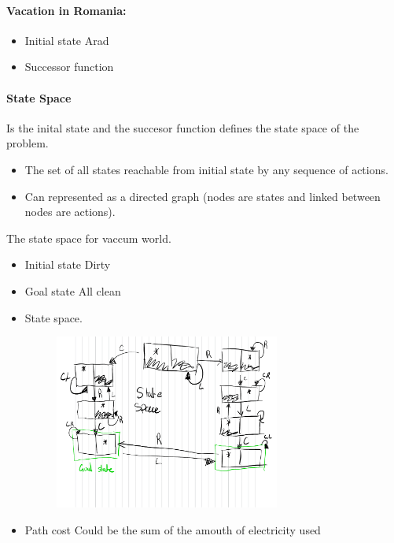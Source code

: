 \documentclass{article}
\begin{document}
\paragraph{Vacation in Romania:}

\begin{itemize}
  \item Initial state
    \subitem Arad
  \item Successor function
    \subitem 
\end{itemize}

\paragraph{State Space}
Is the inital state and the succesor function defines the state space of the
problem. 
\begin{itemize}
  \item The set of all states reachable from initial state by any sequence of
    actions.
  \item Can represented as a directed graph (nodes are states and linked between
    nodes are actions).
\end{itemize}

The state space for vaccum world.
\begin{itemize}
  \item Initial state 
    \subitem Dirty
  \item Goal state
    \subitem All clean
  \item State space.
    \subitem 
    \begin{figure}[H]
      \center
      \includegraphics[width=0.7\textwidth]{./statespace.pdf}
    \end{figure}
  \item Path cost
    \subitem Could be the sum of the amouth of electricity used
\end{itemize}
\end{document}
